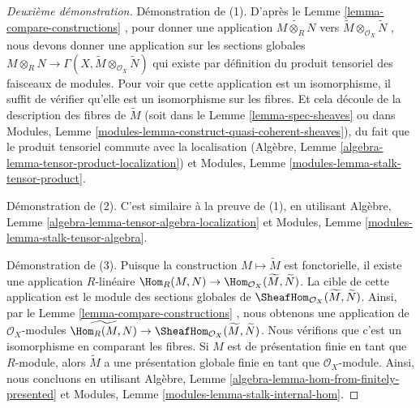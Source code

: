 \begin{proof}[Deuxième démonstration]
Démonstration de (1). D'après le Lemme  \ref{lemma-compare-constructions} , pour donner une application
 $\widetilde{M \otimes_R N}$  vers  $\widetilde M \otimes_{\mathcal{O}_X} \widetilde N$ , nous devons donner une application sur les
sections globales  $M \otimes_R N \to
\Gamma(X, \widetilde M \otimes_{\mathcal{O}_X} \widetilde N)$  qui existe par définition du produit tensoriel des
faisceaux de modules. Pour voir que cette application est un isomorphisme, il
suffit de vérifier qu'elle est un isomorphisme sur les fibres. Et cela découle de
la description des fibres de  $\widetilde{M}$  (soit dans le Lemme  \ref{lemma-spec-sheaves}  ou dans
Modules, Lemme  \ref{modules-lemma-construct-quasi-coherent-sheaves}), du fait que le produit tensoriel commute avec la
localisation (Algèbre, Lemme  \ref{algebra-lemma-tensor-product-localization}) et Modules, Lemme  \ref{modules-lemma-stalk-tensor-product}.

\medskip\noindent
Démonstration de (2). C'est similaire à la preuve de (1), en utilisant Algèbre, Lemme
 \ref{algebra-lemma-tensor-algebra-localization}  et Modules, Lemme  \ref{modules-lemma-stalk-tensor-algebra}.

\medskip\noindent
Démonstration de (3). Puisque la construction  $M \mapsto \widetilde{M}$  est fonctorielle, il
existe une application  $R$-linéaire  $\Hom_R(M, N) \to \Hom_{\mathcal{O}_X}(\widetilde{M}, \widetilde{N})$. La cible de cette
application est le module des sections globales de  $\SheafHom_{\mathcal{O}_X}(\widetilde M, \widetilde N)$. Ainsi, par le Lemme
 \ref{lemma-compare-constructions} , nous obtenons une application de  $\mathcal{O}_X$-modules  $\widetilde{\Hom_R(M,  N)} \to
\SheafHom_{\mathcal{O}_X}(\widetilde M, \widetilde N)$.
Nous vérifions que c'est un isomorphisme en comparant les fibres. Si  $M$ 
est de présentation finie en tant que  $R$-module, alors  $\widetilde M$  a
une présentation globale finie en tant que  $\mathcal{O}_X$-module. Ainsi, nous
concluons en utilisant Algèbre, Lemme  \ref{algebra-lemma-hom-from-finitely-presented}  et Modules, Lemme  \ref{modules-lemma-stalk-internal-hom}.
\end{proof}

